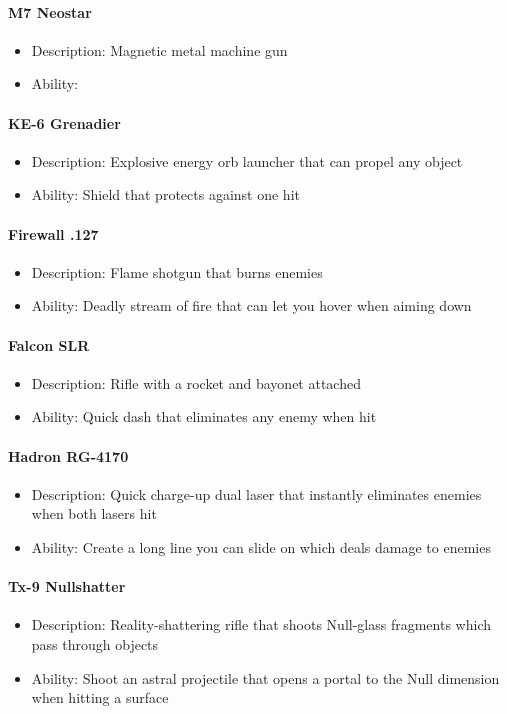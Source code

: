\documentclass[../Main.tex]{subfiles}
\begin{document}
\paragraph{M7 Neostar}

\begin{itemize}
	\item Description: Magnetic metal machine gun
	\item Ability:
\end{itemize} 


\paragraph{KE-6 Grenadier}
 
\begin{itemize}
	\item Description: Explosive energy orb launcher that can propel any object
	\item Ability: Shield that protects against one hit
\end{itemize} 

\paragraph{Firewall .127}

\begin{itemize}
	\item Description: Flame shotgun that burns enemies
	\item Ability: Deadly stream of fire that can let you hover when aiming down
\end{itemize} 

\paragraph{Falcon SLR}

\begin{itemize}
	\item Description: Rifle with a rocket and bayonet attached
	\item Ability: Quick dash that eliminates any enemy when hit
\end{itemize} 


\paragraph{Hadron RG-4170}

\begin{itemize}
	\item Description: Quick charge-up dual laser that instantly eliminates enemies when both lasers hit
	\item Ability: Create a long line you can slide on which deals damage to enemies
\end{itemize} 


\paragraph{Tx-9 Nullshatter}

\begin{itemize}
	\item Description: Reality-shattering rifle that shoots Null-glass fragments which pass through objects 
	\item Ability: Shoot an astral projectile that opens a portal to the Null dimension when hitting a surface
\end{itemize} 
\end{document}
